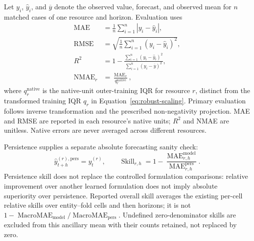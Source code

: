 \documentclass[a4paper,fleqn]{cas-dc}
\begin{document}
Let $y_i$, $\widehat{y}_i$, and $\overline{y}$ denote the observed value,
forecast, and observed mean for $n$ matched cases of one resource and horizon.
Evaluation uses
\begin{equation}
  \begin{aligned}
    \operatorname{MAE} &= \frac{1}{n}\sum_{i=1}^{n}|y_i-\widehat{y}_i|, \\
    \operatorname{RMSE} &=
      \sqrt{\frac{1}{n}\sum_{i=1}^{n}(y_i-\widehat{y}_i)^2}, \\
    R^2 &= 1-
      \frac{\sum_{i=1}^{n}(y_i-\widehat{y}_i)^2}
           {\sum_{i=1}^{n}(y_i-\overline{y})^2}, \\
    \operatorname{NMAE}_r &= \frac{\operatorname{MAE}_r}{q_r^{\mathrm{native}}},
  \end{aligned}
  \label{eq:evaluation-metrics}
\end{equation}
where $q_r^{\mathrm{native}}$ is the native-unit outer-training IQR for resource
$r$, distinct from the transformed training IQR $q_r$ in
Equation~\ref{eq:robust-scaling}. Primary evaluation follows inverse
transformation and the prescribed non-negativity projection. MAE and RMSE are
reported in each resource's native units; $R^2$ and NMAE are unitless.  Native
errors are never averaged across different resources.

Persistence supplies a separate absolute forecasting sanity check:
\begin{equation}
  \widehat{y}_{t+h}^{(r),\mathrm{pers}}=y_t^{(r)},
  \qquad
  \operatorname{Skill}_{r,h}
  =1-\frac{\operatorname{MAE}_{r,h}^{\mathrm{model}}}
           {\operatorname{MAE}_{r,h}^{\mathrm{pers}}}.
  \label{eq:persistence-skill}
\end{equation}
Persistence skill does not replace the controlled formulation comparisons:
relative improvement over another learned formulation does not imply absolute
superiority over persistence. Reported overall skill averages the existing
per-cell relative skills over entity--fold cells and then horizons; it is not
$1-\operatorname{MacroMAE}_{\mathrm{model}}/
\operatorname{MacroMAE}_{\mathrm{pers}}$. Undefined zero-denominator skills
are excluded from this ancillary mean with their counts retained, not
replaced by zero.
\end{document}
